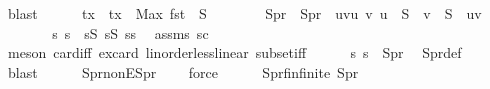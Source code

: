 \begin{isabellebody}
\ blast\isanewline
\isanewline
\ \ \ \ \isamarkupfalse%
\ tx\ \ {\isachardoublequoteopen}tx\ {\isacharequal}{\kern0pt}\ Max\ {\isacharparenleft}{\kern0pt}fst\ {\isacharbackquote}{\kern0pt}\ S{}{\isacharparenright}{\kern0pt}\ {\isacharplus}{\kern0pt}\ {}{\isachardoublequoteclose}\isanewline
\ \ \ \ \isamarkupfalse%
\ S{}pr\ \ {\isachardoublequoteopen}S{}pr\ {\isacharequal}{\kern0pt}\ {\isacharbraceleft}{\kern0pt}{\isacharparenleft}{\kern0pt}u{\isacharcomma}{\kern0pt}v{\isacharparenright}{\kern0pt}{\isacharbar}{\kern0pt}u\ v{\isachardot}{\kern0pt}\ u\ {\isasymin}\ S{}\ {\isasymand}\ v\ {\isasymin}\ S{}\ {\isasymand}\ u{\isacharless}{\kern0pt}v{\isacharbraceright}{\kern0pt}{\isachardoublequoteclose}\isanewline
\ \ \ \ \isamarkupfalse%
\ \isamarkupfalse%
\ s{}\ s{}\ \ {\isachardoublequoteopen}s{}{\isasymin}S{}{\isachardoublequoteclose}\ {\isachardoublequoteopen}s{}{\isasymin}S{}{\isachardoublequoteclose}\ {\isachardoublequoteopen}s{}{\isacharless}{\kern0pt}s{}{\isachardoublequoteclose}\ \isamarkupfalse%
\ assms\ s{}{\isacharunderscore}{\kern0pt}c{}\isanewline
\ \ \ \ \ \ \isamarkupfalse%
\ {\isacharparenleft}{\kern0pt}meson\ card{\isacharunderscore}{\kern0pt}{}{\isacharunderscore}{\kern0pt}iff{\isacharprime}{\kern0pt}\ ex{\isacharunderscore}{\kern0pt}card\ linorder{\isacharunderscore}{\kern0pt}less{\isacharunderscore}{\kern0pt}linear\ subset{\isacharunderscore}{\kern0pt}iff{\isacharparenright}{\kern0pt}\isanewline
\ \ \ \ \isamarkupfalse%
\ {\isachardoublequoteopen}{\isacharparenleft}{\kern0pt}s{}{\isacharcomma}{\kern0pt}\ s{}{\isacharparenright}{\kern0pt}\ {\isasymin}\ S{}pr{\isachardoublequoteclose}\ \isamarkupfalse%
\ S{}pr{\isacharunderscore}{\kern0pt}def\ \isamarkupfalse%
\ blast\isanewline
\ \ \ \ \isamarkupfalse%
\ S{}pr{\isacharunderscore}{\kern0pt}nonE{\isacharcolon}{\kern0pt}{\isachardoublequoteopen}S{}pr\ {\isasymnoteq}\ {\isacharbraceleft}{\kern0pt}{\isacharbraceright}{\kern0pt}{\isachardoublequoteclose}\ \isamarkupfalse%
\ force\isanewline
\ \ \ \ \isamarkupfalse%
\ S{}pr{\isacharunderscore}{\kern0pt}fin{\isacharcolon}{\kern0pt}{\isachardoublequoteopen}finite\ S{}pr{\isachardoublequoteclose}\ \isamarkupfalse%

\end{isabellebody}
